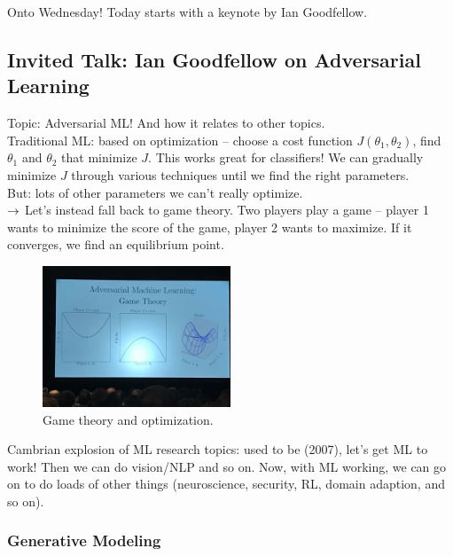 Onto Wednesday! Today starts with a keynote by Ian Goodfellow. \\

\subsection{Invited Talk: Ian Goodfellow on Adversarial Learning}

Topic: Adversarial ML! And how it relates to other topics. \\

Traditional ML: based on optimization -- choose a cost function $J(\theta_1,\theta_2)$, find $\theta_1$ and $\theta_2$ that minimize $J$. This works great for classifiers! We can gradually minimize $J$ through various techniques until we find the right parameters. \\

But: lots of other parameters we can't really optimize. \\

$\rightarrow$ Let's instead fall back to game theory. Two players play a game -- player 1 wants to minimize the score of the game, player 2 wants to maximize. If it converges, we find an equilibrium point.\\

\begin{figure}
    \centering
    \includegraphics[width=0.5\textwidth]{images/game.JPG}
    \caption{Game theory and optimization.}
    \label{fig:games}
\end{figure}

Cambrian explosion of ML research topics: used to be (2007), let's get ML to work! Then we can do vision/NLP and so on. Now, with ML working, we can go on to do loads of other things (neuroscience, security, RL, domain adaption, and so on). \\


\subsubsection{Generative Modeling}

